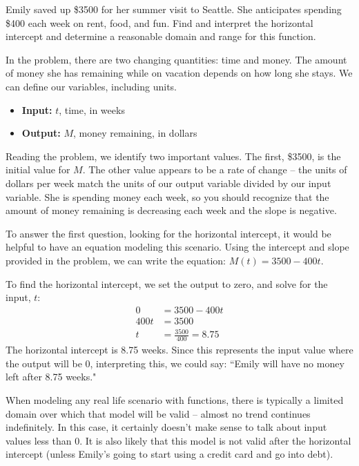 \begin{example}

Emily saved up \$3500 for her summer visit to Seattle. She anticipates spending \$400 each week on rent, food, and fun. Find and interpret the horizontal intercept and determine a reasonable domain and range for this function.

\begin{solution} In the problem, there are two changing quantities: time and money. The amount of money she has remaining while on vacation depends on how long she stays. We can define our variables, including units.
  \begin{itemize}
    \item[] {\bf Input:} $t$, time, in weeks
    \item[] {\bf Output:} $M$, money remaining, in dollars
  \end{itemize}
Reading the problem, we identify two important values. The first, \$3500, is the initial value for $M$. The other value appears to be a rate of change -- the units of dollars per week match the units of our output variable divided by our input variable. She is spending money each week, so you should recognize that the amount of money remaining is
decreasing each week and the slope is negative.

To answer the first question, looking for the horizontal intercept, it would be helpful to have an equation modeling this scenario. Using the intercept and slope provided in the problem, we can write the equation: $M(t) = 3500-400t$.

To find the horizontal intercept, we set the output to zero, and solve for the input, $t$:
\begin{align*}
  0 &= 3500  - 400 t \\
  400t &= 3500 \\
  t &= \frac{3500}{400} = 8.75
\end{align*}
The horizontal intercept is 8.75 weeks. Since this represents the input value where the output will be $0$, interpreting this, we could say: ``Emily will have no money left after 8.75 weeks."

When modeling any real life scenario with functions, there is typically a limited domain over which that model will be valid -- almost no trend continues indefinitely. In this case, it certainly doesn't make sense to talk about input values less than $0$. It is also likely that this model is not valid after the horizontal intercept (unless Emily's going to start using a credit card and go into debt).


\end{solution}
\end{example}
